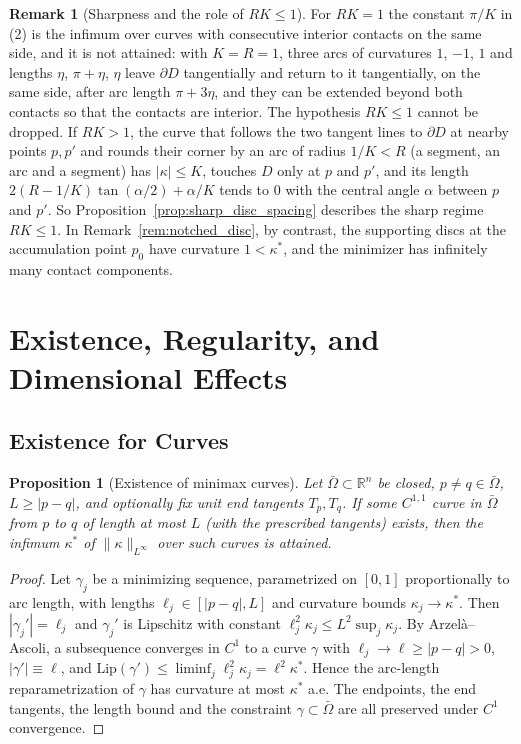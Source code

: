 \documentclass[11pt,reqno]{amsart}
\newtheorem{proposition}[theorem]{Proposition}
\theoremstyle{definition}
\newtheorem{remark}[theorem]{Remark}
\providecommand{\R}{\mathbb{R}}
\numberwithin{equation}{section}
\providecommand{\R}{\mathbb{R}}
\begin{document}
\begin{remark}[Sharpness and the role of $RK \le 1$]
\label{rem:sharp_disc_regime}
For $RK = 1$ the constant $\pi/K$ in (2) is the infimum over curves with consecutive interior contacts on the same side, and it is not attained: with $K = R = 1$, three arcs of curvatures $1$, $-1$, $1$ and lengths $\eta$, $\pi + \eta$, $\eta$ leave $\partial D$ tangentially and return to it tangentially, on the same side, after arc length $\pi + 3\eta$, and they can be extended beyond both contacts so that the contacts are interior. The hypothesis $RK \le 1$ cannot be dropped. If $RK > 1$, the curve that follows the two tangent lines to $\partial D$ at nearby points $p, p'$ and rounds their corner by an arc of radius $1/K < R$ (a segment, an arc and a segment) has $|\kappa| \le K$, touches $D$ only at $p$ and $p'$, and its length $2(R - 1/K)\tan(\alpha/2) + \alpha/K$ tends to $0$ with the central angle $\alpha$ between $p$ and $p'$. So Proposition~\ref{prop:sharp_disc_spacing} describes the sharp regime $RK \le 1$. In Remark~\ref{rem:notched_disc}, by contrast, the supporting discs at the accumulation point $p_0$ have curvature $1 < \kappa^*$, and the minimizer has infinitely many contact components.
\end{remark}

\section{Existence, Regularity, and Dimensional Effects}

\subsection{Existence for Curves}

\begin{proposition}[Existence of minimax curves]
\label{thm:existence}
Let $\bar\Omega \subset \R^n$ be closed, $p \ne q \in \bar\Omega$, $L \ge |p-q|$, and optionally fix unit end tangents $T_p, T_q$. If some $C^{1,1}$ curve in $\bar\Omega$ from $p$ to $q$ of length at most $L$ (with the prescribed tangents) exists, then the infimum $\kappa^*$ of $\|\kappa\|_{L^\infty}$ over such curves is attained.
\end{proposition}

\begin{proof}
Let $\gamma_j$ be a minimizing sequence, parametrized on $[0,1]$ proportionally to arc length, with lengths $\ell_j \in [|p-q|, L]$ and curvature bounds $\kappa_j \to \kappa^*$. Then $|\gamma_j'| = \ell_j$ and $\gamma_j'$ is Lipschitz with constant $\ell_j^2 \kappa_j \le L^2 \sup_j \kappa_j$. By Arzel\`a--Ascoli, a subsequence converges in $C^1$ to a curve $\gamma$ with $\ell_j \to \ell \ge |p-q| > 0$, $|\gamma'| \equiv \ell$, and $\mathrm{Lip}(\gamma') \le \liminf_j \ell_j^2\kappa_j = \ell^2\kappa^*$. Hence the arc-length reparametrization of $\gamma$ has curvature at most $\kappa^*$ a.e. The endpoints, the end tangents, the length bound and the constraint $\gamma \subset \bar\Omega$ are all preserved under $C^1$ convergence.
\end{proof}
\end{document}
